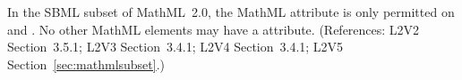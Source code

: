 In the SBML subset of MathML~2.0, the MathML attribute
 is only permitted on 
and .  No other
MathML elements may have a  attribute.  (References:
L2V2 Section~3.5.1; L2V3 Section~3.4.1; L2V4 Section~3.4.1; 
L2V5 Section~\ref{sec:mathmlsubset}.)
